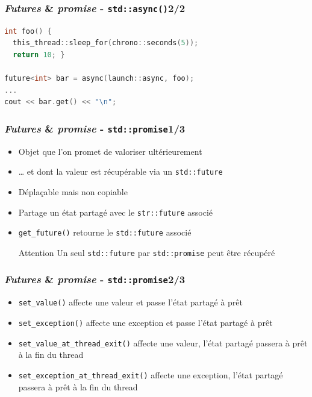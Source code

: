 \documentclass[C++.tex]{subfiles}
\begin{document}
\begin{frame}[fragile]
	\frametitle{\textit{Futures} \& \textit{promise} - \lstinline|std::async()|\titlehfill{}2/2}
	\begin{lstlisting}[language=C++]
int foo() {
  this_thread::sleep_for(chrono::seconds(5));
  return 10; }

future<int> bar = async(launch::async, foo);
...
cout << bar.get() << "\n";\end{lstlisting}
\end{frame}

\begin{frame}[fragile]
	\frametitle{\textit{Futures} \& \textit{promise} - \lstinline|std::promise|\titlehfill{}1/3}
	\begin{itemize}
		\item Objet que l'on promet de valoriser ultérieurement
		\item \ldots{} et dont la valeur est récupérable via un \lstinline|std::future|
		\item Déplaçable mais non copiable
		\item Partage un état partagé avec le \lstinline|str::future| associé
		\item \lstinline|get_future()| retourne le \lstinline|std::future| associé

		\begin{alertblock}{Attention}
			Un seul \lstinline|std::future| par \lstinline|std::promise| peut être récupéré
		\end{alertblock}
	\end{itemize}
\end{frame}

\begin{frame}[fragile]
	\frametitle{\textit{Futures} \& \textit{promise} - \lstinline|std::promise|\titlehfill{}2/3}
	\begin{itemize}
		\item \lstinline|set_value()| affecte une valeur et passe l'état partagé à prêt
		\item \lstinline|set_exception()| affecte une exception et passe l'état partagé à prêt
		\item \lstinline|set_value_at_thread_exit()| affecte une valeur, l'état partagé passera à prêt à la fin du thread
		\item \lstinline|set_exception_at_thread_exit()| affecte une exception, l'état partagé passera à prêt à la fin du thread
	\end{itemize}
\end{frame}
\end{document}
